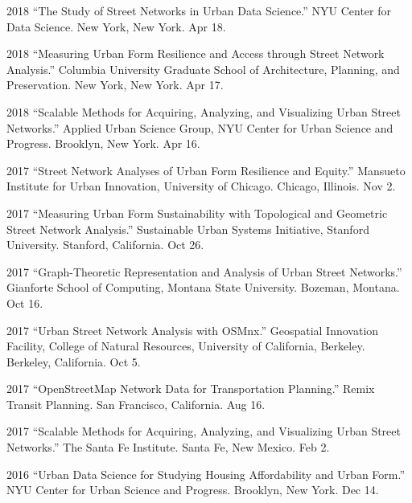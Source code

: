 \documentclass{academiccv}
\begin{document}
\begin{tablist}

\item[2018] \tab \enquote{The Study of Street Networks in Urban Data Science.} NYU Center for Data Science. New York, New York. Apr 18.

\item[2018] \tab \enquote{Measuring Urban Form Resilience and Access through Street Network Analysis.} Columbia University Graduate School of Architecture, Planning, and Preservation. New York, New York. Apr 17.

\item[2018] \tab \enquote{Scalable Methods for Acquiring, Analyzing, and Visualizing Urban Street Networks.} Applied Urban Science Group, NYU Center for Urban Science and Progress. Brooklyn, New York. Apr 16.

\item[2017] \tab \enquote{Street Network Analyses of Urban Form Resilience and Equity.} Mansueto Institute for Urban Innovation, University of Chicago. Chicago, Illinois. Nov 2.

\item[2017] \tab \enquote{Measuring Urban Form Sustainability with Topological and Geometric Street Network Analysis.} Sustainable Urban Systems Initiative, Stanford University. Stanford, California. Oct 26.

\item[2017] \tab \enquote{Graph-Theoretic Representation and Analysis of Urban Street Networks.} Gianforte School of Computing, Montana State University. Bozeman, Montana. Oct 16.

\item[2017] \tab \enquote{Urban Street Network Analysis with OSMnx.} Geospatial Innovation Facility, College of Natural Resources, University of California, Berkeley. Berkeley, California. Oct 5.

\item[2017] \tab \enquote{OpenStreetMap Network Data for Transportation Planning.} Remix Transit Planning. San Francisco, California. Aug 16.

\item[2017] \tab \enquote{Scalable Methods for Acquiring, Analyzing, and Visualizing Urban Street Networks.} The Santa Fe Institute. Santa Fe, New Mexico. Feb 2.

\item[2016] \tab \enquote{Urban Data Science for Studying Housing Affordability and Urban Form.} NYU Center for Urban Science and Progress. Brooklyn, New York. Dec 14.


\end{tablist}
\end{document}
